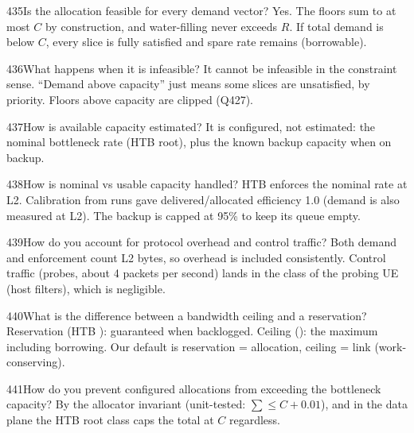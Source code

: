 \begin{qa}{435}{Is the allocation feasible for every demand vector?}
Yes. The floors sum to at most $C$ by construction, and water-filling never exceeds $R$. If total demand is below $C$,
every slice is fully satisfied and spare rate remains (borrowable).
\end{qa}

\begin{qa}{436}{What happens when it is infeasible?}
It cannot be infeasible in the constraint sense. ``Demand above capacity'' just means some slices are unsatisfied, by
priority. Floors above capacity are clipped (Q427).
\end{qa}

\begin{qa}{437}{How is available capacity estimated?}
It is configured, not estimated: the nominal bottleneck rate (HTB root), plus the known backup capacity when on backup.
\end{qa}

\begin{qa}{438}{How is nominal vs usable capacity handled?}
HTB enforces the nominal rate at L2. Calibration from runs gave delivered/allocated efficiency 1.0 (demand is also
measured at L2). The backup is capped at 95\% to keep its queue empty.
\end{qa}

\begin{qa}{439}{How do you account for protocol overhead and control traffic?}
Both demand and enforcement count L2 bytes, so overhead is included consistently. Control traffic (probes, about 4
packets per second) lands in the class of the probing UE (host filters), which is negligible.
\end{qa}

\begin{qa}{440}{What is the difference between a bandwidth ceiling and a reservation?}
Reservation (HTB ): guaranteed when backlogged. Ceiling (): the maximum including borrowing.
Our default is reservation = allocation, ceiling = link (work-conserving).
\end{qa}

\begin{qa}{441}{How do you prevent configured allocations from exceeding the bottleneck capacity?}
By the allocator invariant (unit-tested: $\sum\le C+0.01$), and in the data plane the HTB root class caps the total at
$C$ regardless.
\end{qa}

